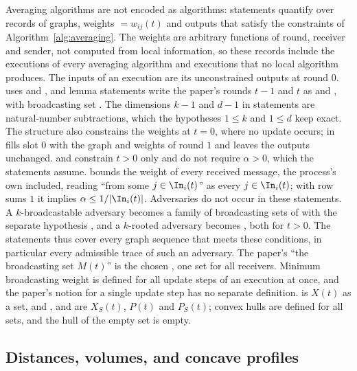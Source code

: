 Averaging algorithms are not encoded as algorithms: statements quantify over  records of graphs, weights ${}=w_{ij}(t)$ and outputs that satisfy the constraints of Algorithm~\ref{alg:averaging}. The weights are arbitrary functions of round, receiver and sender, not computed from local information, so these records include the executions of every averaging algorithm and executions that no local algorithm produces. The inputs of an execution are its unconstrained outputs at round $0$.  uses  and , and lemma statements write the paper's rounds $t-1$ and $t$ as  and , with broadcasting set . The dimensions $k-1$ and $d-1$ in statements are natural-number subtractions, which the hypotheses $1\leq k$ and $1\leq d$ keep exact. The structure also constrains the weights at $t=0$, where no update occurs;  in  fills slot $0$ with the graph and weights of round $1$ and leaves the outputs unchanged.  and  constrain $t>0$ only and do not require $\alpha>0$, which the statements assume.  bounds the weight of every received message, the process's own included, reading ``from some $j\in\In_i(t)$'' as every $j\in\In_i(t)$; with row sums $1$ it implies $\alpha\leq1/\lvert\In_i(t)\rvert$. Adversaries do not occur in these statements. A $k$-broadcastable adversary becomes a family  of broadcasting sets of  with the separate hypothesis , and a $k$-rooted adversary becomes , both for $t>0$. The statements thus cover every graph sequence that meets these conditions, in particular every admissible trace of such an adversary. The paper's ``the broadcasting set $M(t)$'' is the chosen , one set for all receivers. Minimum broadcasting weight is defined for all update steps of an execution at once, and the paper's notion for a single update step has no separate definition.  is $X(t)$ as a set, and ,  and  are $X_S(t)$, $P(t)$ and $P_S(t)$; convex hulls are defined for all sets, and the hull of the empty set is empty.

\subsection{Distances, volumes, and concave profiles}\label{app:lean-geometry}

